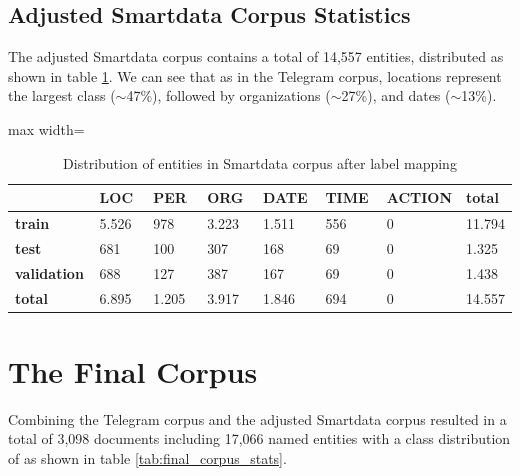 \subsection{Adjusted Smartdata Corpus Statistics}
The adjusted Smartdata corpus contains a total of 14,557 entities, distributed as shown in table \ref{tab:sm_corpus_stats}. We can see that as in the Telegram corpus, locations represent the largest class ($\sim$47\%), followed by organizations ($\sim$27\%), and dates ($\sim$13\%). 

\begin{table}[h]
\caption{Distribution of entities in Smartdata corpus after label mapping}
\label{tab:sm_corpus_stats}
\centering
\begin{adjustbox}{max width=\textwidth}
\begin{tabular}{|p{0.18\linewidth}|p{0.15\linewidth}|p{0.15\linewidth}|p{0.15\linewidth}|p{0.15\linewidth}|p{0.15\linewidth}|p{0.15\linewidth}|p{0.15\linewidth}|}
\hline
& \textbf{LOC} & \textbf{PER} & \textbf{ORG} & \textbf{DATE} & \textbf{TIME} & \textbf{ACTION} & \textbf{total} \\ \hline 
\textbf{train} & 5.526 & 978 & 3.223 & 1.511 & 556 & 0 & 11.794 \\ \hline
\textbf{test} & 681 & 100 & 307 & 168 & 69 & 0 & 1.325 \\ \hline
\textbf{validation} & 688 & 127 & 387 & 167 & 69 & 0 & 1.438 \\ \hline
\textbf{total} &  6.895 &  1.205 &  3.917 & 1.846 & 694 & 0 & 14.557  \\ \hline
\end{tabular}
\end{adjustbox}
\end{table}

\section{The Final Corpus}
\label{sec:final_corpus}
Combining the Telegram corpus and the adjusted Smartdata corpus resulted in a total of 3,098 documents including 17,066 named entities with a class distribution of as shown in table \ref{tab:final_corpus_stats}. 



